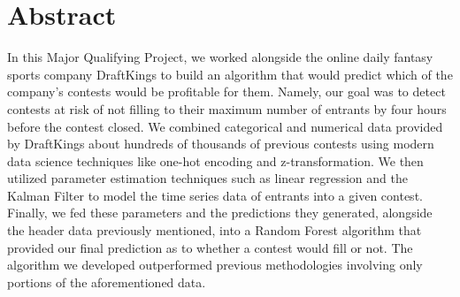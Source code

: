 \chapter*{Abstract}


In this Major Qualifying Project, we worked alongside the online daily fantasy sports company DraftKings to build an algorithm that would predict which of the company's contests would be profitable for them. Namely, our goal was to detect contests at risk of not filling to their maximum number of entrants by four hours before the contest closed. We combined categorical and numerical data provided by DraftKings about hundreds of thousands of previous contests using modern data science techniques like one-hot encoding and z-transformation. We then utilized parameter estimation techniques such as linear regression and the Kalman Filter to model the time series data of entrants into a given contest. Finally, we fed these parameters and the predictions they generated, alongside the header data previously mentioned, into a Random Forest algorithm that provided our final prediction as to whether a contest would fill or not. The algorithm we developed outperformed previous methodologies involving only portions of the aforementioned data. 